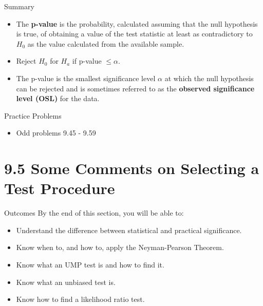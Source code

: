\documentclass[
  ignorenonframetext,
]{beamer}
\providecommand{\tightlist}{%
  \setlength{\itemsep}{0pt}\setlength{\parskip}{0pt}}\usepackage{longtable,booktabs,array}
\begin{document}
\begin{frame}{Summary}
\protect\hypertarget{summary-6}{}
\begin{itemize}[<+->]
\tightlist
\item
  The \textbf{p-value} is the probability, calculated assuming that the
  null hypothesis is true, of obtaining a value of the test statistic at
  least as contradictory to \(H_{0}\) as the value calculated from the
  available sample.
\item
  Reject \(H_{0}\) for \(H_{a}\) if p-value \(\leq \alpha\).
\item
  The p-value is the smallest significance level \(\alpha\) at which the
  null hypothesis can be rejected and is sometimes referred to as the
  \textbf{observed significance level (OSL)} for the data.
\end{itemize}
\end{frame}

\begin{frame}{Practice Problems}
\protect\hypertarget{practice-problems-3}{}
\begin{itemize}[<+->]
\tightlist
\item
  Odd problems 9.45 - 9.59
\end{itemize}
\end{frame}

\hypertarget{some-comments-on-selecting-a-test-procedure}{%
\section{9.5 Some Comments on Selecting a Test
Procedure}\label{some-comments-on-selecting-a-test-procedure}}

\begin{frame}{Outcomes}
\protect\hypertarget{outcomes-4}{}
By the end of this section, you will be able to:

\begin{itemize}[<+->]
\tightlist
\item
  Understand the difference between statistical and practical
  significance.
\item
  Know when to, and how to, apply the Neyman-Pearson Theorem.
\item
  Know what an UMP test is and how to find it.
\item
  Know what an unbiased test is.
\item
  Know how to find a likelihood ratio test.
\end{itemize}
\end{frame}
\end{document}
